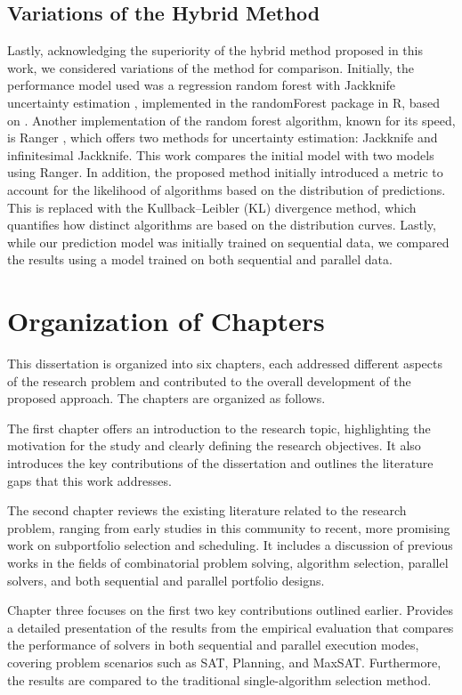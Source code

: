 \subsection{Variations of the Hybrid Method}
Lastly, acknowledging the superiority of the hybrid method proposed in this work, we considered variations of the method for comparison. Initially, the performance model used was a regression random forest with Jackknife uncertainty estimation \cite{wager2014confidence}, implemented in the randomForest package in R, based on \cite{randomforest}. Another implementation of the random forest algorithm, known for its speed, is Ranger \cite{ranger}, which offers two methods for uncertainty estimation: Jackknife and infinitesimal Jackknife. This work compares the initial model with two models using Ranger. In addition, the proposed method initially introduced a metric to account for the likelihood of algorithms based on the distribution of predictions. This is replaced with the Kullback–Leibler (KL) divergence method, which quantifies how distinct algorithms are based on the distribution curves. Lastly, while our prediction model was initially trained on sequential data, we compared the results using a model trained on both sequential and parallel data.


\section{Organization of Chapters}

This dissertation is organized into six chapters, each addressed different aspects of the research problem and contributed to the overall development of the proposed approach. The chapters are organized as follows.

The first chapter offers an introduction to the research topic, highlighting the motivation for the study and clearly defining the research objectives. It also introduces the key contributions of the dissertation and outlines the literature gaps that this work addresses.

The second chapter reviews the existing literature related to the research problem, ranging from early studies in this community to recent, more promising work on subportfolio selection and scheduling. It includes a discussion of previous works in the fields of combinatorial problem solving, algorithm selection, parallel solvers, and both sequential and parallel portfolio designs.

Chapter three focuses on the first two key contributions outlined earlier. Provides a detailed presentation of the results from the empirical evaluation that compares the performance of solvers in both sequential and parallel execution modes, covering problem scenarios such as SAT, Planning, and MaxSAT. Furthermore, the results are compared to the traditional single-algorithm selection method.

